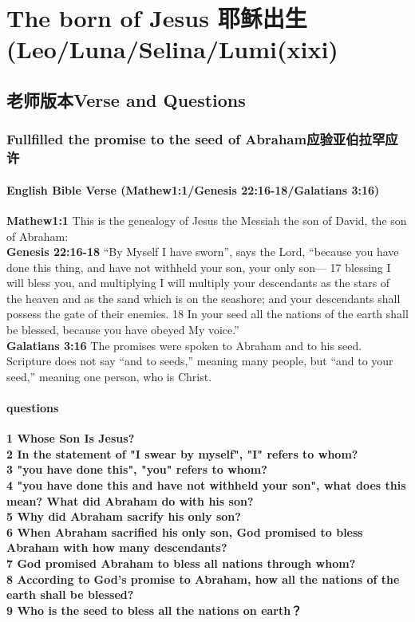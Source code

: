 \chapter{The born of Jesus 耶稣出生 (Leo/Luna/Selina/Lumi(xixi)}

\section{老师版本Verse and Questions}
\subsection{Fullfilled the promise to the seed of Abraham应验亚伯拉罕应许}

\subsubsection{English Bible Verse (Mathew1:1/Genesis 22:16-18/Galatians 3:16)}
\textbf{Mathew1:1} This is the genealogy of Jesus the Messiah the son of David, the son of Abraham:\\
\textbf{Genesis 22:16-18} “By Myself I have sworn”, says the Lord, “because you have done this thing, and have not withheld your son, your only son— 17 blessing I will bless you, and multiplying I will multiply your descendants as the stars of the heaven and as the sand which is on the seashore; and your descendants shall possess the gate of their enemies. 18 In your seed all the nations of the earth shall be blessed, because you have obeyed My voice.”\\
\textbf{Galatians 3:16} The promises were spoken to Abraham and to his seed. Scripture does not say “and to seeds,” meaning many people, but “and to your seed,”  meaning one person, who is Christ.

\subsubsection{questions}
\textbf{1 Whose Son Is Jesus?}\\
\textbf{2 In the statement of "I swear by myself", "I" refers to whom?}\\
\textbf{3 "you have done this", "you" refers to whom?}\\
\textbf{4 "you have done this and have not withheld your son", what does this mean? What did Abraham do with his son?}\\
\textbf{5 Why did Abraham sacrify his only son?}\\
\textbf{6 When Abraham sacrified his only son, God promised to bless Abraham with how many descendants?}\\
\textbf{7 God promised Abraham to bless all nations through whom?}\\
\textbf{8 According to God's promise to Abraham, how all the nations of the earth shall be blessed?}\\
\textbf{9 Who is the seed to bless all the nations on earth？}\\


